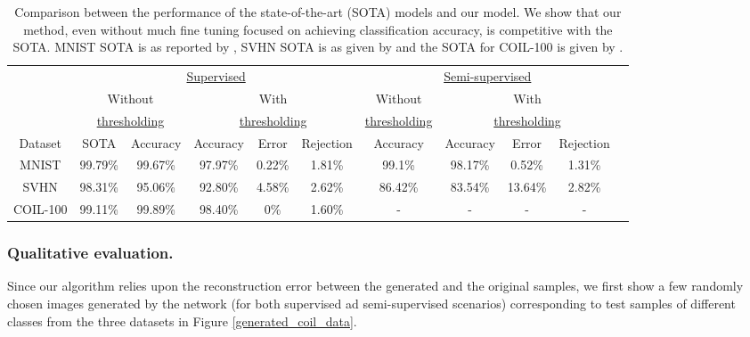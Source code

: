 \documentclass[letterpaper]{article} %
\begin{document}
\begin{center}
\begin{table}[t!]
  \centering
  \begin{tabular}{cccc c c c c c c c}
      \hline
     &  \multicolumn{5}{c}{\underline{\qquad \qquad \quad \qquad Supervised\qquad \qquad \qquad}\qquad \quad} & \multicolumn{4}{c}{\underline{\qquad \qquad \quad Semi-supervised \quad\qquad \qquad}\qquad \qquad \qquad}\rule{0pt}{2.6ex}\\
      & \multicolumn{2}{c}{Without} & \multicolumn{3}{c}{With} & \multicolumn{1}{c}{Without} & \multicolumn{3}{c}{With} \rule{0pt}{2.6ex}\\
      & \multicolumn{2}{c}{\underline{\quad thresholding\quad}} & \multicolumn{3}{c}{\underline{\qquad\qquad thresholding \qquad\quad}} & \multicolumn{1}{c}{\underline{thresholding}} & \multicolumn{3}{c}{\underline{\qquad\quad\quad thresholding\quad\qquad\qquad}} \rule{0pt}{2.6ex}\\
      Dataset & SOTA & Accuracy & Accuracy & Error & Rejection & Accuracy & Accuracy & Error & Rejection\rule{0pt}{2.6ex}\\
      MNIST & 99.79\% & 99.67\% & 97.97\% & 0.22\%  & 1.81\% & 99.1\% & 98.17\% & 0.52\% & 1.31\%\\
      SVHN & 98.31\% & 95.06\% & 92.80\% & 4.58\% & 2.62\%  & 86.42\% & 83.54\% & 13.64\% & 2.82\%\\
      COIL-100 & 99.11\% & 99.89\% & 98.40\% & 0\% & 1.60\% & - & - & - & -\\
      \hline
  \end{tabular}
  \caption{Comparison between the performance of the state-of-the-art (SOTA) models and our model. We show that our method, even without much fine tuning focused on achieving classification accuracy, is competitive with the SOTA. MNIST SOTA is as reported by , SVHN SOTA is as given by  and the SOTA for COIL-100 is given by .}
  \label{Comp_normal_classifier}
\end{table}
\end{center}

\subsubsection{Qualitative evaluation.}
Since our algorithm relies upon the reconstruction error between the generated and the original samples, we first show a few randomly chosen images generated by the network (for both supervised ad semi-supervised scenarios) corresponding to test samples of different classes from the three datasets in Figure \ref{generated_coil_data}.
\end{document}
